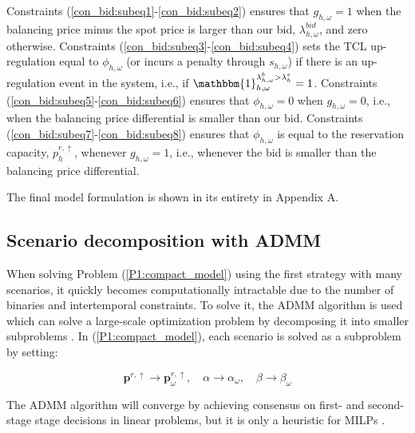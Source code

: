 Constraints (\ref{con_bid:subeq1}-\ref{con_bid:subeq2}) ensures that $g_{h,\omega} = 1$ when the balancing price minus the spot price is larger than our bid, $\lambda^{bid}_{h, \omega}$, and zero otherwise. Constraints (\ref{con_bid:subeq3}-\ref{con_bid:subeq4}) sets the TCL up-regulation equal to $\phi_{h,\omega}$ (or incurs a penalty through $s_{h,\omega}$) if there is an up-regulation event in the system, i.e., if $\mathbbm{1}_{h,\omega}^{\lambda^{b}_{h,\omega} > \lambda^{s}_{h}} = 1$. Constraints (\ref{con_bid:subeq5}-\ref{con_bid:subeq6}) ensures that $\phi_{h,\omega} = 0$ when $g_{h,\omega} = 0$, i.e., when the balancing price differential is smaller than our bid. Constraints (\ref{con_bid:subeq7}-\ref{con_bid:subeq8}) ensures that $\phi_{h,\omega}$ is equal to the reservation capacity, $p^{r,\uparrow}_{h}$, whenever $g_{h,\omega} = 1$, i.e., whenever the bid is smaller than the balancing price differential.

The final model formulation is shown in its entirety in Appendix A.

\subsection{Scenario decomposition with ADMM}

When solving Problem (\ref{P1:compact_model}) using the first strategy with many scenarios, it quickly becomes computationally intractable due to the number of binaries and intertemporal constraints. To solve it, the ADMM algorithm is used which can solve a large-scale optimization problem by decomposing it into smaller subproblems \cite{boyd2011distributed}. In (\ref{P1:compact_model}), each scenario is solved as a subproblem by setting:

\begin{equation}\label{eq:non_anticipativity}
    \bm{p}^{r,\uparrow} \rightarrow \bm{p}^{r,\uparrow}_{\omega}, \quad \alpha \rightarrow \alpha_{\omega}, \quad \beta \rightarrow \beta_{\omega}
\end{equation}

The ADMM algorithm will converge by achieving consensus on first- and second-stage stage decisions in linear problems, but it is only a heuristic for MILPs \cite{hong2016convergence}.